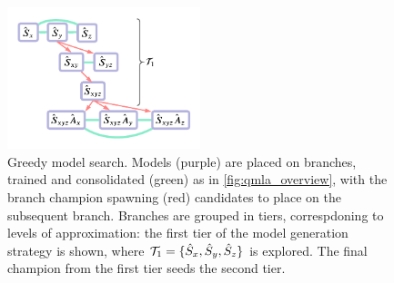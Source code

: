 \begin{figure}
    \begin{center}
        \includegraphics[width=0.5\textwidth]{experimental_study/figures/greedy_search.pdf}
    \end{center}
    \caption[Greedy model search]{
        Greedy model search. 
        Models (purple) are placed on branches, trained and consolidated (green) as in \cref{fig:qmla_overview}, 
            with the branch champion spawning (red) candidates to place on the subsequent branch.  
        Branches are grouped in tiers, correspdoning to levels of approximation:
            the first tier of the model generation strategy is shown, 
            where $\mathcal{T}_1 = \{ \hat{S}_x, \hat{S}_y, \hat{S}_z\}$ is explored. 
        The final champion from the first tier seeds the second tier. 
    }
    \label{fig:greedy_search}
\end{figure}

